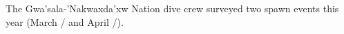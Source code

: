 The Gwa'sala-'Nakwaxda'xw Nation dive crew surveyed two spawn events this year
(March / and April /).